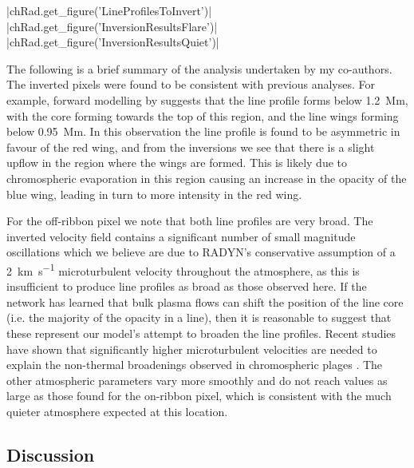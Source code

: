 \py[Radynversion]|chRad.get_figure('LineProfilesToInvert')|
\py[Radynversion]|chRad.get_figure('InversionResultsFlare')|
\py[Radynversion]|chRad.get_figure('InversionResultsQuiet')|

The following is a brief summary of the analysis undertaken by my co-authors.
The inverted pixels were found to be consistent with previous analyses.
For example, forward modelling by \citet{Kuridze2015} suggests that the \Ha{} line profile forms below \SI{1.2}{\mega\metre}, with the core forming towards the top of this region, and the line wings forming below \SI{0.95}{\mega\metre}.
In this observation the \Ha{} line profile is found to be asymmetric in favour of the red wing, and from the inversions we see that there is a slight upflow in the region where the wings are formed.
This is likely due to chromospheric evaporation in this region causing an increase in the opacity of the blue wing, leading in turn to more intensity in the red wing.

For the off-ribbon pixel we note that both line profiles are very broad.
The inverted velocity field contains a significant number of small magnitude oscillations which we believe are due to RADYN's conservative assumption of a \SI{2}{\kilo\metre\per\second} microturbulent velocity throughout the atmosphere, as this is insufficient to produce line profiles as broad as those observed here.
If the network has learned that bulk plasma flows can shift the position of the line core (i.e. the majority of the opacity in a line), then it is reasonable to suggest that these represent our model's attempt to broaden the line profiles.
Recent studies have shown that significantly higher microturbulent velocities are needed to explain the non-thermal broadenings observed in chromospheric plages \citep[\SIrange{6}{7}{\kilo\metre\per\second};][]{2015Carlsson}.
The other atmospheric parameters vary more smoothly and do not reach values as large as those found for the on-ribbon pixel, which is consistent with the much quieter atmosphere expected at this location.

\subsection{Discussion}

